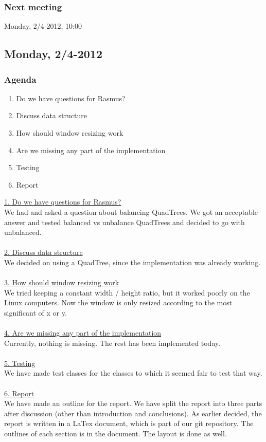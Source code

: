 \documentclass[a4paper,11pt]{article}
\begin{document}
\subsubsection*{Next meeting}
Monday, 2/4-2012, 10:00


\pagebreak
\subsection{Monday, 2/4-2012}

\subsubsection*{Agenda}
\begin{enumerate}
	\item Do we have questions for Rasmus?
	\item Discuss data structure
	\item How should window resizing work
	\item Are we missing any part of the implementation
	\item Testing
	\item Report
\end{enumerate}
\underline{1. Do we have questions for Rasmus?} \\
We had and asked a question about balancing QuadTrees. We got an acceptable answer and tested balanced vs unbalance QuadTrees and decided to go with unbalanced. \\ \\
\underline{2. Discuss data structure} \\
We decided on using a QuadTree, since the implementation was already working. \\ \\
\underline{3. How should window resizing work} \\
We tried keeping a constant width / height ratio, but it worked poorly on the Linux computers. Now the window is only resized according to the most significant of x or y. \\ \\
\underline{4. Are we missing any part of the implementation} \\
Currently, nothing is missing. The rest has been implemented today. \\ \\
\underline{5. Testing} \\
We have made test classes for the classes to which it seemed fair to test that way. \\ \\
\underline{6. Report} \\
We have made an outline for the report. We have split the report into three parts after discussion (other than introduction and conclusions). As earlier decided, the report is written in a LaTex document, which is part of our git repository. The outlines of each section is in the document. The layout is done as well. \\ \\
\end{document}
